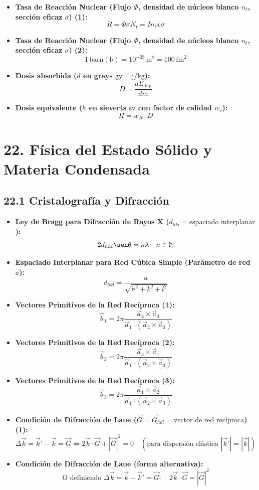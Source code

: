 \documentclass[11pt,a4paper]{article}
\begin{document}
\begin{itemize}
  \item \textbf{Tasa de Reacción Nuclear (Flujo $\Phi$, densidad de núcleos blanco $n_t$, sección eficaz $\sigma$) (1):}
  \[
    R = \Phi \sigma N_t = I n_t x \sigma
  \]
  \item \textbf{Tasa de Reacción Nuclear (Flujo $\Phi$, densidad de núcleos blanco $n_t$, sección eficaz $\sigma$) (2):}
  \[
    1 \, \text{barn} (\mathrm{b}) = 10^{-28} \, \mathrm{m}^2 = 100 \, \mathrm{fm}^2
  \]
  \item \textbf{Dosis absorbida ($d$ en grays $\mathrm{gy} = \mathrm{j/kg}$):}
  \[
    D = \frac{dE_{\mathrm{dep}}}{dm}
  \]
  \item \textbf{Dosis equivalente ($h$ en sieverts $\mathrm{sv}$ con factor de calidad $w_r$):}
  \[
    H = w_R \cdot D
  \]
\end{itemize}

\section*{22. Física del Estado Sólido y Materia Condensada}

\subsection*{22.1 Cristalografía y Difracción}

\begin{itemize}
  \item \textbf{Ley de Bragg para Difracción de Rayos X ($d_{hkl} = \text{espaciado interplanar}$):}
  \[
    2 d_{hkl} \sen\theta = n \lambda \quad n \in \mathbb{N}
  \]
  \item \textbf{Espaciado Interplanar para Red Cúbica Simple (Parámetro de red $a$):}
  \[
    d_{hkl} = \frac{a}{\sqrt{h^2 + k^2 + l^2}}
  \]
  \item \textbf{Vectores Primitivos de la Red Recíproca (1):}
  \[
    \vec{b}_1 = 2\pi \frac{\vec{a}_2 \times \vec{a}_3}{\vec{a}_1 \cdot (\vec{a}_2 \times \vec{a}_3)}
  \]
  \item \textbf{Vectores Primitivos de la Red Recíproca (2):}
  \[
    \vec{b}_2 = 2\pi \frac{\vec{a}_3 \times \vec{a}_1}{\vec{a}_1 \cdot (\vec{a}_2 \times \vec{a}_3)}
  \]
  \item \textbf{Vectores Primitivos de la Red Recíproca (3):}
  \[
    \vec{b}_3 = 2\pi \frac{\vec{a}_1 \times \vec{a}_2}{\vec{a}_1 \cdot (\vec{a}_2 \times \vec{a}_3)}
  \]
  \item \textbf{Condición de Difracción de Laue ($\vec{G} = \vec{G}_{hkl} = \text{vector de red recíproca}$) (1):}
  \[
    \Delta\vec{k} = \vec{k}' - \vec{k} = \vec{G} \iff 2\vec{k} \cdot \vec{G} + |\vec{G}|^2 = 0 \quad (\text{para dispersión elástica } |\vec{k}'| = |\vec{k}|)
  \]
  \item \textbf{Condición de Difracción de Laue (forma alternativa):}
  \[
    \text{O definiendo } \Delta\vec{k} = \vec{k} - \vec{k}' = \vec{G}: \quad 2\vec{k} \cdot \vec{G} = |\vec{G}|^2
  \]
\end{itemize}
\end{document}
